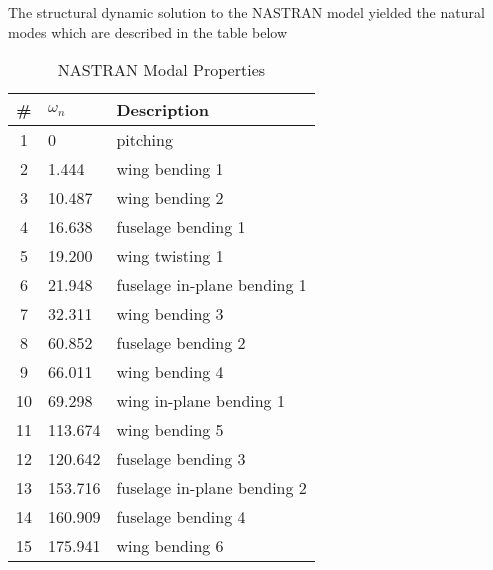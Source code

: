 The structural dynamic solution to the NASTRAN model yielded the natural modes which are described in the table below
\begin{table}[H]
	\centering
	\label{tab:nastranResult}
	\caption{NASTRAN Modal Properties}
	\begin{tabular}{cll}
		\hline
		\# & $\omega_n$ & Description \\
		\hline\hline
		1  &   0     & pitching \\
		2  &   1.444 & wing bending 1 \\
		3  &  10.487 & wing bending 2 \\
		4  &  16.638 & fuselage bending 1 \\
		5  &  19.200 & wing twisting 1 \\
		6  &  21.948 & fuselage in-plane bending 1 \\
		7  &  32.311 & wing bending 3 \\
		8  &  60.852 & fuselage bending 2 \\
		9  &  66.011 & wing bending 4 \\
		10 &  69.298 & wing in-plane bending 1 \\
		11 & 113.674 & wing bending 5 \\
		12 & 120.642 & fuselage bending 3 \\
		13 & 153.716 & fuselage in-plane bending 2  \\
		14 & 160.909 & fuselage bending 4 \\
		15 & 175.941 & wing bending 6 \\
		\hline
	\end{tabular}
\end{table}